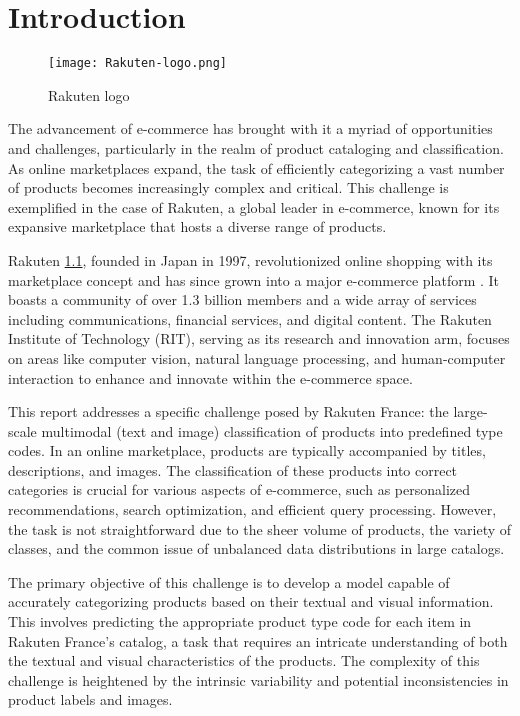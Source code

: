 \chapter{Introduction}
\label{sec:introduction}
\begin{figure}[H]
    \centering
    \texttt{[image: Rakuten-logo.png]}
    \caption{Rakuten logo}
    \label{fig:rakuten}
\end{figure}

The advancement of e-commerce has brought with it a myriad of opportunities and challenges, particularly in the realm of product cataloging and classification. As online marketplaces expand, the task of efficiently categorizing a vast number of products becomes increasingly complex and critical. This challenge is exemplified in the case of Rakuten, a global leader in e-commerce, known for its expansive marketplace that hosts a diverse range of products.




Rakuten \ref{fig:rakuten}, founded in Japan in 1997, revolutionized online shopping with its marketplace concept and has since grown into a major e-commerce platform \cite{brian-2022}. It boasts a community of over 1.3 billion members \cite{statista-2023} and a wide array of services including communications, financial services, and digital content. The Rakuten Institute of Technology (RIT), serving as its research and innovation arm, focuses on areas like computer vision, natural language processing, and human-computer interaction to enhance and innovate within the e-commerce space.

This report addresses a specific challenge posed by Rakuten France: the large-scale multimodal (text and image) classification of products into predefined type codes. In an online marketplace, products are typically accompanied by titles, descriptions, and images. The classification of these products into correct categories is crucial for various aspects of e-commerce, such as personalized recommendations, search optimization, and efficient query processing. However, the task is not straightforward due to the sheer volume of products, the variety of classes, and the common issue of unbalanced data distributions in large catalogs.

The primary objective of this challenge is to develop a model capable of accurately categorizing products based on their textual and visual information. This involves predicting the appropriate product type code for each item in Rakuten France's catalog, a task that requires an intricate understanding of both the textual and visual characteristics of the products. The complexity of this challenge is heightened by the intrinsic variability and potential inconsistencies in product labels and images.

